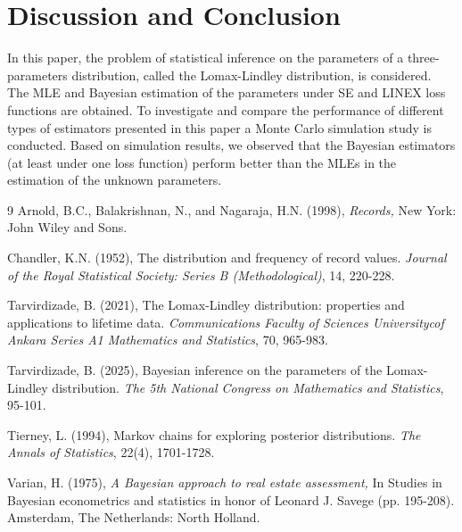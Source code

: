 \documentclass[twoside]{article}
\begin{document}
\section*{Discussion and Conclusion}   
In this paper, the problem of statistical inference on the parameters of a three-parameters distribution, called the Lomax-Lindley distribution, is considered. The MLE and Bayesian estimation of the parameters under SE and LINEX loss functions are obtained. To investigate and compare the performance of different types of estimators presented in this paper a Monte Carlo simulation study is conducted. Based on simulation results, we observed that the Bayesian estimators
(at least under one loss function) perform better than the MLEs in the estimation of the unknown parameters.


\begin{thebibliography}{9}
Arnold, B.C., Balakrishnan, N., and Nagaraja, H.N. (1998), {\it Records,} New York: John Wiley and
Sons.

Chandler, K.N. (1952), The distribution and frequency of record values. {\it Journal of the Royal Statistical Society: Series B (Methodological)}, 14, 220-228. 

Tarvirdizade, B. (2021), The Lomax-Lindley distribution: properties and applications to lifetime data. {\it Communications Faculty of Sciences Universitycof Ankara Series A1 Mathematics and Statistics}, 70, 965-983.

Tarvirdizade, B. (2025), Bayesian inference on the parameters of the Lomax-Lindley distribution. {\it The 5th National Congress on Mathematics and Statistics}, 95-101.

Tierney, L. (1994), Markov chains for exploring posterior distributions. {\it The Annals of Statistics},
22(4), 1701-1728. 

Varian, H. (1975), {\it A Bayesian approach to real estate assessment,} In Studies in Bayesian econometrics and statistics in honor of Leonard J. Savege (pp. 195-208). Amsterdam, The Netherlands: North Holland.

\end{thebibliography}
 
\end{document}
